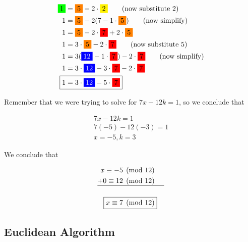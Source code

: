 \documentclass[../../Main.tex]{subfiles}
\begin{document}
\begin{example}
    \begin{align*}
        \greenbox{1} &= \orangebox{5} - 2 \cdot \yellowbox{2} \tag{now substitute 2} \\
        1 &= \orangebox{5} - 2(7 - 1 \cdot \orangebox{5}) \tag{now simplify} \\
        1 &= \orangebox{5} - 2 \cdot \redbox{7} + 2 \cdot \orangebox{5} \\
        1 &= 3 \cdot \orangebox{5} - 2 \cdot \redbox{7} \tag{now substitute 5} \\
        1 &= 3(\bluebox{12} - 1 \cdot \redbox{7}) - 2 \cdot \redbox{7} \tag{now simplify} \\
        1 &= 3 \cdot \bluebox{12} - 3 \cdot \redbox{7} - 2 \cdot \redbox{7} \\
        \Aboxed{1 &= 3 \cdot \bluebox{12} - 5 \cdot \redbox{7}} \\
    \end{align*}

    Remember that we were trying to solve for $7x - 12k = 1$, so we conclude that 

    \begin{align*}
        7x - 12k = 1 \\
        7(-5) - 12(-3) = 1 \\
        x = -5, k = 3
    \end{align*}

    We conclude that

    \begin{align*}
        x \equiv -5 \pmod{12} \\ 
        +0 \equiv 12 \pmod{12} \\
        \hline \\
        \Aboxed{x \equiv 7 \pmod{12}}
    \end{align*}

\end{example}

\subsection{Euclidean Algorithm}
\end{document}
